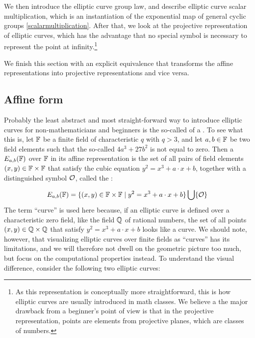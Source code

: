 We then introduce the elliptic curve group law, and describe elliptic curve scalar multiplication, which is an instantiation of the exponential map of general cyclic groups \ref{scalarmultiplication}. After that, we look at the projective representation of elliptic curves, which has the advantage that no special symbol is necessary to represent the point at infinity.\footnote{As this representation is conceptually more straightforward, this is how elliptic curves are usually introduced in math classes. We believe a the major drawback from a beginner's point of view is that in the projective representation, points are elements from projective planes, which are classes of numbers.}

We finish this section with an explicit equivalence that transforms the affine representations into projective representations and vice versa.

\subsection{Affine  form} Probably the least abstract and most straight-forward way to introduce elliptic curves for non-mathematicians and beginners is the so-called  of a . To see what this is, let $\mathbb{F}$ be a finite field of characteristic $q$ with $q>3$, and let $a,b\in \mathbb{F}$ be two field elements such that the so-called  $4a^3+ 27b^2$ is not equal to zero. Then a  $E_{a,b}(\mathbb{F})$ over $\mathbb{F}$ in its affine representation is the set of all pairs of field elements $(x,y)\in \mathbb{F}\times \mathbb{F}$ that satisfy the  cubic equation $y^2=x^3+a\cdot x+b$, together with a distinguished symbol $\mathcal{O}$, called the :

\begin{equation}
\label{def_short_weierstrass_curve}
E_{a,b}(\mathbb{F}) = \{(x,y)\in \mathbb{F}\times \mathbb{F}\;|\; y^2=x^3+a\cdot x+b \} \bigcup \{\mathcal{O}\}
\end{equation}
The term ``curve'' is used here because, if an elliptic curve is defined over a characteristic zero field, like the field $\mathbb{Q}$ of rational numbers, the set of all points $(x,y)\in \mathbb{Q}\times \mathbb{Q}$ that satisfy $y^2 = x^3 +a\cdot x +b$ looks like a curve. We should note, however, that visualizing elliptic curves over finite fields as ``curves'' has its limitations, and we will therefore not dwell on the geometric picture too much, but focus on the computational properties instead. To understand the visual difference, consider the following two elliptic curves: 

